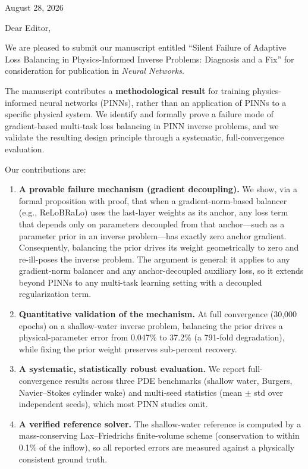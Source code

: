 \documentclass[11pt]{article}
\begin{document}
\begin{flushright}
August 28, 2026
\end{flushright}

\vspace{0.8cm}

Dear Editor,

We are pleased to submit our manuscript entitled ``Silent Failure of Adaptive Loss Balancing in Physics-Informed Inverse Problems: Diagnosis and a Fix'' for consideration for publication in \textit{Neural Networks}.

The manuscript contributes a \textbf{methodological result} for training physics-informed neural networks (PINNs), rather than an application of PINNs to a specific physical system. We identify and formally prove a failure mode of gradient-based multi-task loss balancing in PINN inverse problems, and we validate the resulting design principle through a systematic, full-convergence evaluation.

Our contributions are:

\begin{enumerate}
\item \textbf{A provable failure mechanism (gradient decoupling).} We show, via a formal proposition with proof, that when a gradient-norm-based balancer (e.g., ReLoBRaLo) uses the last-layer weights as its anchor, any loss term that depends only on parameters decoupled from that anchor---such as a parameter prior in an inverse problem---has exactly zero anchor gradient. Consequently, balancing the prior drives its weight geometrically to zero and re-ill-poses the inverse problem. The argument is general: it applies to any gradient-norm balancer and any anchor-decoupled auxiliary loss, so it extends beyond PINNs to any multi-task learning setting with a decoupled regularization term.
\item \textbf{Quantitative validation of the mechanism.} At full convergence (30,000 epochs) on a shallow-water inverse problem, balancing the prior drives a physical-parameter error from 0.047\% to 37.2\% (a 791-fold degradation), while fixing the prior weight preserves sub-percent recovery.
\item \textbf{A systematic, statistically robust evaluation.} We report full-convergence results across three PDE benchmarks (shallow water, Burgers, Navier--Stokes cylinder wake) and multi-seed statistics (mean $\pm$ std over independent seeds), which most PINN studies omit.
\item \textbf{A verified reference solver.} The shallow-water reference is computed by a mass-conserving Lax--Friedrichs finite-volume scheme (conservation to within 0.1\% of the inflow), so all reported errors are measured against a physically consistent ground truth.
\end{enumerate}
\end{document}

